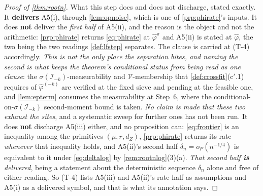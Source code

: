 \begin{proof}[Proof of \cref{thm:rootn}]
What this step does and does not discharge, stated exactly.
It \textbf{delivers} A5(i), through \cref{lem:opnoise}, which is one of \cref{prp:phirate}'s inputs.
It does \textbf{not} deliver the \emph{first half} of A5(ii), and the reason is the object and not the
arithmetic: \cref{prp:phirate} returns \eqref{eq:phirate} at $\hat\varphi^{\pi}$ and A5(ii) is stated at
$\hat\varphi$, the two being the two readings \cref{def:lfstep} separates.
The clause is carried at (T-4) accordingly. \emph{This is not the only place the separation bites, and
naming the second is what keeps the theorem's conditional status from being read as one clause}: the
$\sigma(\mathcal I_{-k})$-measurability and $\mathcal V$-membership that \cref{def:crossfit}\textup{(c$'$.1)}
requires of $\hat\varphi^{(-k)}$ are verified at the fixed sieve and pending at the feasible one, and
\cref{lem:epterm} consumes the measurability at Step~6, where the conditional-on-$\sigma(\mathcal I_{-k})$
second-moment bound is taken. \emph{No claim is made that these two exhaust
the sites}, and a systematic sweep for further ones has not been run.
It does \textbf{not} discharge A5(iii) either, and no proposition can: \eqref{eq:frontier} is an inequality among
the primitives $(\mu,r,d_Z)$, \cref{prp:phirate} returns its rate \emph{whenever} that inequality holds, and
A5(ii)'s second half $\delta_n=o_P(n^{-1/4})$ is equivalent to it under \eqref{eq:deltalog} by
\cref{rem:rootnlog}\textup{(3)(a)}. \emph{That second half \textbf{is} delivered}, being a statement
about the deterministic sequence $\delta_n$ alone and free of either reading. So (T-4) lists A5(iii) and
A5(ii)'s rate half as assumptions and A5(i) as a delivered symbol, and that is what its annotation says.


\end{proof}
